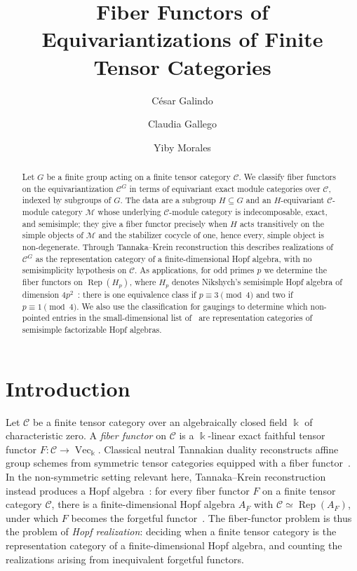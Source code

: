 \documentclass[12pt]{amsart}
\title[Fiber Functors of Equivariantizations]{Fiber Functors of Equivariantizations of Finite Tensor Categories}
\author[C. Galindo]{C\'esar Galindo}
\author[C. Gallego]{Claudia Gallego}
\author[Y. Morales]{Yiby Morales}
\date{}
\theoremstyle{plain}
\theoremstyle{definition} %
\theoremstyle{remark} %
\newcommand{\ku}{{\Bbbk}} %
\DeclareMathOperator{\VecCat}{Vec}
\newcommand{\cC}{\mathcal{C}}
\newcommand{\cM}{\mathcal{M}}
\newcommand{\Rep}{\operatorname{Rep}}
\begin{document}
\begin{abstract}
Let $G$ be a finite group acting on a finite tensor category $\cC$. We classify fiber functors on the equivariantization $\cC^G$ in terms of equivariant exact module categories over $\cC$, indexed by subgroups of $G$. The data are a subgroup $H\subseteq G$ and an $H$-equivariant $\cC$-module category $\cM$ whose underlying $\cC$-module category is indecomposable, exact, and semisimple; they give a fiber functor precisely when $H$ acts transitively on the simple objects of $\cM$ and the stabilizer cocycle of one, hence every, simple object is non-degenerate. Through Tannaka--Krein reconstruction this describes realizations of $\cC^G$ as the representation category of a finite-dimensional Hopf algebra, with no semisimplicity hypothesis on $\cC$. As applications, for odd primes $p$ we determine the fiber functors on $\Rep(H_p)$, where $H_p$ denotes Nikshych's semisimple Hopf algebra of dimension $4p^2$~\cite{Nik08}: there is one equivalence class if $p\equiv3\pmod4$ and two if $p\equiv1\pmod4$. We also use the classification for gaugings to determine which non-pointed entries in the small-dimensional list of~\cite{GNradical} are representation categories of semisimple factorizable Hopf algebras.
\end{abstract}
\maketitle

\section{Introduction}

Let $\cC$ be a finite tensor category over an algebraically closed field $\ku$ of characteristic zero. A \emph{fiber functor} on $\cC$ is a $\ku$-linear exact faithful tensor functor $F:\cC\to\VecCat_{\ku}$. Classical neutral Tannakian duality reconstructs affine group schemes from symmetric tensor categories equipped with a fiber functor~\cite{Saavedra72, DM82}. In the non-symmetric setting relevant here, Tannaka--Krein reconstruction instead produces a Hopf algebra~\cite{JS91, Schauenburg92, BV07}: for every fiber functor $F$ on a finite tensor category $\cC$, there is a finite-dimensional Hopf algebra $A_F$ with $\cC\simeq\Rep(A_F)$, under which $F$ becomes the forgetful functor~\cite[Theorem~5.3.12]{EGNO15}. The fiber-functor problem is thus the problem of \emph{Hopf realization}: deciding when a finite tensor category is the representation category of a finite-dimensional Hopf algebra, and counting the realizations arising from inequivalent forgetful functors.
\end{document}
